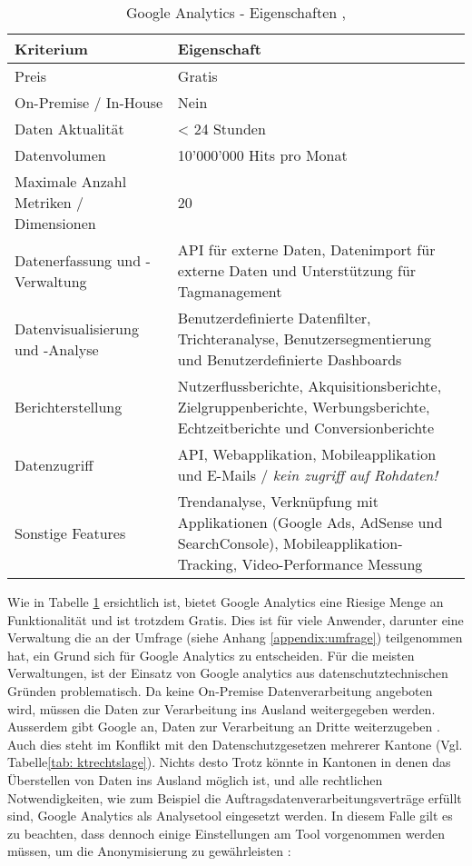 \begin{table}[h]
	\centering
	\begin{tabular}{ | p{4cm} | p{10cm} |}
		\hline
		\textbf{Kriterium} & \textbf{Eigenschaft}  \\ 
		\hline
		Preis & Gratis \\
    \hline
    On-Premise / In-House & Nein \\
    \hline
    Daten Aktualität & < 24 Stunden \\
    \hline
    Datenvolumen & 10'000'000 Hits pro Monat\\
    \hline
    Maximale Anzahl Metriken / Dimensionen & 20\\
    \hline
    Datenerfassung und -Verwaltung & API für externe Daten, Datenimport für externe Daten und Unterstützung für Tagmanagement\\
    \hline
    Datenvisualisierung und -Analyse & Benutzerdefinierte Datenfilter, Trichteranalyse, Benutzersegmentierung und Benutzerdefinierte Dashboards\\
    \hline
    Berichterstellung & Nutzerflussberichte, Akquisitionsberichte, Zielgruppenberichte, Werbungsberichte, Echtzeitberichte und Conversionberichte \\
    \hline
    Datenzugriff & API, Webapplikation, Mobileapplikation und E-Mails / \textit{kein zugriff auf Rohdaten!}\\
    \hline
    Sonstige Features & Trendanalyse, Verknüpfung mit Applikationen (Google Ads, AdSense und SearchConsole), Mobileapplikation-Tracking, Video-Performance Messung\\
		\hline  
	\end{tabular}
	\caption{Google Analytics - Eigenschaften \parencite {GoogleAnalyticsCompare}, \parencite{GoogleAnalyticsFeatures}}
	\label{tab: googleAnalyticsFeatures}
\end{table}

Wie in Tabelle \ref{tab: googleAnalyticsFeatures} ersichtlich ist, bietet Google Analytics eine Riesige Menge an Funktionalität und ist trotzdem Gratis. Dies ist für viele Anwender, darunter eine Verwaltung die an der Umfrage (siehe Anhang \ref{appendix:umfrage}) teilgenommen hat, ein Grund sich für Google Analytics zu entscheiden. Für die meisten Verwaltungen, ist der Einsatz von Google analytics aus datenschutztechnischen Gründen problematisch. Da keine On-Premise Datenverarbeitung angeboten wird, müssen die Daten zur Verarbeitung ins Ausland weitergegeben werden. Ausserdem gibt Google an, Daten zur Verarbeitung an Dritte weiterzugeben \parencite{GoogleInfoSharing}. Auch dies steht im Konflikt mit den Datenschutzgesetzen mehrerer Kantone (Vgl. Tabelle\ref{tab: ktrechtslage}). Nichts desto Trotz könnte in Kantonen in denen das Überstellen von Daten ins Ausland möglich ist, und alle rechtlichen Notwendigkeiten, wie zum Beispiel die Auftragsdatenverarbeitungsverträge erfüllt sind, Google Analytics als Analysetool eingesetzt werden. In diesem Falle gilt es zu beachten, dass dennoch einige Einstellungen am Tool vorgenommen werden müssen, um die Anonymisierung zu gewährleisten \parencite{GoogleAnalyticsDatenschutzEinstellungen}: 

